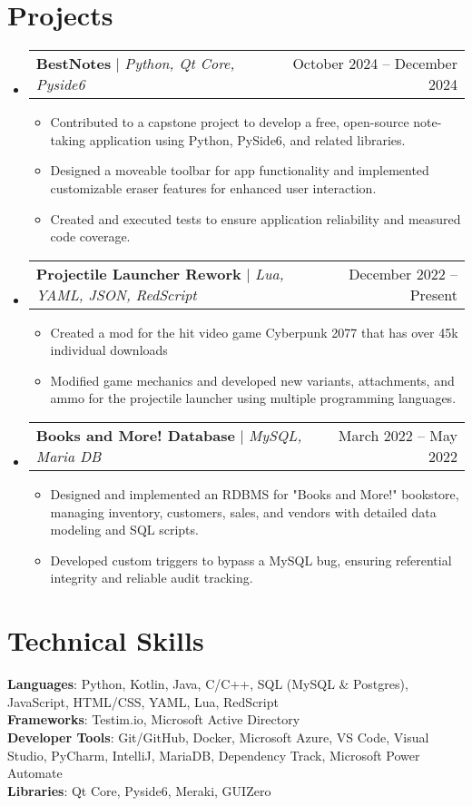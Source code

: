 \documentclass[letterpaper,11pt]{article}
\makeatletter
\newcommand{\resumeItem}[1]{
  \item\small{
    {#1 \vspace{-2pt}}
  }
}
\newcommand{\resumeProjectHeading}[2]{
    \item
    \begin{tabular*}{0.97\textwidth}{l@{\extracolsep{\fill}}r}
      \small#1 & #2 \\
    \end{tabular*}\vspace{-7pt}
}
\newcommand{\resumeSubHeadingListStart}{\begin{itemize}[leftmargin=0.15in, label={}]}
\newcommand{\resumeSubHeadingListEnd}{\end{itemize}}
\newcommand{\resumeItemListStart}{\begin{itemize}}
\newcommand{\resumeItemListEnd}{\end{itemize}\vspace{-5pt}}
\makeatother
\begin{document}
\section{Projects}
    \resumeSubHeadingListStart
      \resumeProjectHeading
          {\textbf{BestNotes} $|$ \emph{Python, Qt Core, Pyside6}}{October 2024 -- December 2024}
          \resumeItemListStart
            \resumeItem{Contributed to a capstone project to develop a free, open-source note-taking application using Python, PySide6, and related libraries.}
            \resumeItem{Designed a moveable toolbar for app functionality and implemented customizable eraser features for enhanced user interaction.}
            \resumeItem{Created and executed tests to ensure application reliability and measured code coverage.}
          \resumeItemListEnd
      \resumeProjectHeading
          {\textbf{Projectile Launcher Rework} $|$ \emph{Lua, YAML, JSON, RedScript}}{December 2022 -- Present}
          \resumeItemListStart
            \resumeItem{Created a mod for the hit video game Cyberpunk 2077 that has over 45k individual downloads}
            \resumeItem{Modified game mechanics and developed new variants, attachments, and ammo for the projectile launcher using multiple programming languages.}
          \resumeItemListEnd
      \resumeProjectHeading
          {\textbf{Books and More! Database} $|$ \emph{MySQL, Maria DB}}{March 2022 -- May 2022}
          \resumeItemListStart
            \resumeItem{Designed and implemented an RDBMS for "Books and More!" bookstore, managing inventory, customers, sales, and vendors with detailed data modeling and SQL scripts.}
            \resumeItem{Developed custom triggers to bypass a MySQL bug, ensuring referential integrity and reliable audit tracking.}
          \resumeItemListEnd
    \resumeSubHeadingListEnd



%
\section{Technical Skills}
 \begin{itemize}[leftmargin=0.15in, label={}]
    \small{\item{
     \textbf{Languages}{: Python, Kotlin, Java, C/C++, SQL (MySQL \& Postgres), JavaScript, HTML/CSS, YAML, Lua, RedScript} \\
     \textbf{Frameworks}{: Testim.io, Microsoft Active Directory} \\
     \textbf{Developer Tools}{: Git/GitHub, Docker, Microsoft Azure, VS Code, Visual Studio, PyCharm, IntelliJ, MariaDB, Dependency Track, Microsoft Power Automate} \\
     \textbf{Libraries}{: Qt Core, Pyside6, Meraki, GUIZero}
    }}
 \end{itemize}


\end{document}
